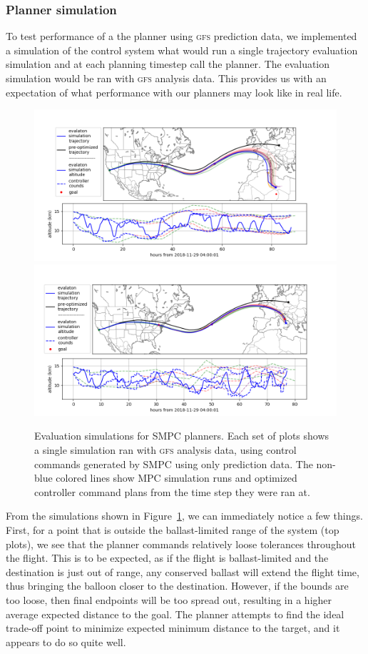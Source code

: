 \documentclass[11pt]{scrartcl} %
\begin{document}
\subsubsection{Planner simulation}
To test performance of a the planner using \textsc{gfs} prediction data, we implemented a simulation of the control system what would run a single trajectory evaluation simulation and at each planning timestep call the planner. The evaluation simulation would be ran with \textsc{gfs} analysis data. This provides us with an expectation of what performance with our planners may look like in real life.
\begin{figure}[h!]
\includegraphics[width=\linewidth]{../../figs/mpc/mpc1.png}
\includegraphics[width=\linewidth]{../../figs/mpc/mpc2.png}
\caption{Evaluation simulations for SMPC planners. Each set of plots shows a single simulation ran with \textsc{gfs} analysis data, using control commands generated by SMPC using only prediction data. The non-blue colored lines show MPC simulation runs and optimized controller command plans from the time step they were ran at.}
\label{mpc}
\end{figure}

From the simulations shown in Figure~\ref{mpc}, we can immediately notice a few things. First, for a point that is outside the ballast-limited range of the system (top plots), we see that the planner commands relatively loose tolerances throughout the flight. This is to be expected, as if the flight is ballast-limited and the destination is just out of range, any conserved ballast will extend the flight time, thus bringing the balloon closer to the destination. However, if the bounds are too loose, then final endpoints will be too spread out, resulting in a higher average expected distance to the goal. The planner attempts to find the ideal trade-off point to minimize expected minimum distance to the target, and it appears to do so quite well.
\end{document}
